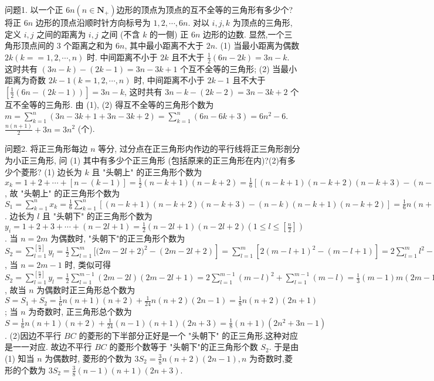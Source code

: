 
问题1. 以一个正 $6 n\left(n \in \mathbf{N}_{+}\right)$边形的顶点为顶点的互不全等的三角形有多少个? 
将正 $6 n$ 边形的顶点沿顺时针方向标号为 $1,2, \cdots, 6 n$. 对以 $i, j, k$ 为顶点的三角形, 定义 $i, j$ 之间的距离为 $i, j$ 之间 (不含 $k$ 的一侧) 正 $6 n$ 边形的边数.
显然,一个三角形顶点间的 3 个距离之和为 $6 n$, 其中最小距离不大于 $2 n$. (1) 当最小距离为偶数 $2 k(k==1,2, \cdots, n)$ 时.
中间距离不小于 $2 k$ 且不大于 $\frac{1}{2}(6 n-2 k)=3 n-k$. 这时共有 $(3 n-k)-(2 k-1)=3 n-3 k+1$ 个互不全等的三角形; (2) 当最小距离为奇数 $2 k-1(k=1,2, \cdots, n)$ 时, 中间距离不小于 $2 k-1$ 且不大于 $\left[\frac{1}{2}(6 n-(2 k-1))\right]=3 n-k$, 这时共有 $3 n-k- (2 k-2)=3 n-3 k+2$ 个互不全等的三角形.
由 (1), (2) 得互不全等的三角形个数为 $m=\sum_{k=1}^n(3 n-3 k+1+3 n-3 k+2)=\sum_{k=1}^n(6 n-6 k+3)=6 n^2-6$. $\frac{n(n+1)}{2}+3 n=3 n^2$ (个).



问题2. 将正三角形每边 $n$ 等分, 过分点在正三角形内作边的平行线将正三角形剖分为小正三角形, 问 (1) 其中有多少个正三角形 (包括原来的正三角形在内)?(2)有多少个菱形?
(1) 边长为 $k$ 且 "头朝上" 的正三角形个数为 $x_k=1+2+\cdots+[n- (k-1)]=\frac{1}{2}(n-k+1)(n-k+2)=\frac{1}{6}[(n-k+1)(n-k+2)(n-k+ 3)-(n-k)(n-k+1)(n-k+2)]$, 故 "头朝上" 的正三角形个数为 $S_1= \sum_{k=1}^n x_k=\frac{1}{6} \sum_{k=1}^n[(n-k+1)(n-k+2)(n-k+3)-(n-k)(n-k+1)(n- k+2)]=\frac{1}{6} n(n+1)(n+2)$. 边长为 $l$ 且 "头朝下" 的正三角形个数为 $y_i= 1+2+3+\cdots+(n-2 l+1)=\frac{1}{2}(n-2 l+1)(n-2 l+2)\left(1 \leqslant l \leqslant\left[\frac{n}{2}\right]\right)$.
当 $n=2 m$ 为偶数时, "头朝下"的正三角形个数为 $S_2=\sum_{l=1}^{\left[\frac{n}{2}\right]} y_l=\frac{1}{2} \sum_{l=1}^m[(2 m- \left.2 l+2)^2-(2 m-2 l+2)\right]=\sum_{l=1}^m\left[2(m-l+1)^2-(m-l+1)\right]=2 \sum_{l=1}^m l^2- \sum_{l=1}^m l=2 \times \frac{1}{6} m(m+1)(2 m+1)-\frac{1}{2} m(m+1)=\frac{1}{6} m(m+1)(4 m-1)= \frac{1}{24} n(n+2)(2 n-1)$, 当 $n=2 m-1$ 时, 类似可得 $S_2=\sum_{l=1}^{\left[\frac{n}{2}\right]} y_l=\frac{1}{2} \sum_{l=1}^{m-1}(2 m- 2 l)(2 m-2 l+1)=2 \sum_{l=1}^{m-1}(m-l)^2+\sum_{l=1}^{m-1}(m-l)=\frac{1}{3}(m-1) m(2 m-1)+ \frac{1}{2}(m-1) m=\frac{1}{6}(m-1) m(4 m+1)=\frac{1}{24}(n-1)(n+1)(2 n+3)$, 故当 $n$ 为偶数时正三角形总个数为 $S=S_1+S_2=\frac{1}{6} n(n+1)(n+2)+\frac{1}{24} n(n+2) (2 n-1)=\frac{1}{8} n(n+2)(2 n+1)$; 当 $n$ 为奇数时, 正三角形总个数为 $S= \frac{1}{6} n(n+1)(n+2)+\frac{1}{24}(n-1)(n+1)(2 n+3)=\frac{1}{8}(n+1)\left(2 n^2+3 n-1\right)$.
(2)因边不平行 $B C$ 的菱形的下半部分正好是一个 "头朝下" 的正三角形,这种对应是一一对应.
故边不平行 $B C$ 的菱形个数等于 "头朝下"的正三角形个数 $S_2$. 于是由 (1) 知当 $n$ 为偶数时, 菱形的个数为 $3 S_2=\frac{3}{8} n(n+2)(2 n- 1), n$ 为奇数时,菱形的个数为 $3 S_2=\frac{3}{8}(n-1)(n+1)(2 n+3)$.



